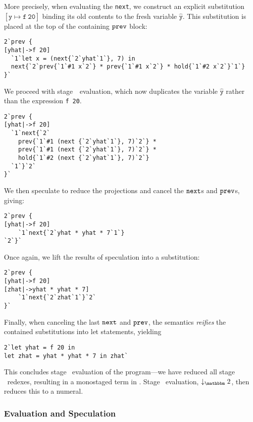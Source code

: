 More precisely, when evaluating the \verb|next|, we construct an explicit
substitution $\mathtt{[\hat y\mapsto f~20]}$ binding its old contents to the
fresh variable $\mathtt{\hat y}$. This substitution is placed at the top of the
containing ${\tt prev}$ block:
\begin{lstlisting} 
2`prev {
[yhat|->f 20]
  `1`let x = (next{`2`yhat`1`}, 7) in
  next{`2`prev{`1`#1 x`2`} * prev{`1`#1 x`2`} * hold{`1`#2 x`2`}`1`}
}`
\end{lstlisting}
We proceed with stage~\bbone\ evaluation, which now duplicates the variable
$\mathtt{\hat y}$ rather than the expression \verb|f 20|.
\begin{lstlisting} 
2`prev {
[yhat|->f 20]
  `1`next{`2`
    prev{`1`#1 (next {`2`yhat`1`}, 7)`2`} * 
    prev{`1`#1 (next {`2`yhat`1`}, 7)`2`} *
    hold{`1`#2 (next {`2`yhat`1`}, 7)`2`}
  `1`}`2`
}`
\end{lstlisting}
We then speculate to reduce the projections and cancel the ${\tt next}$s and ${\tt prev}$s, giving:
\begin{lstlisting} 
2`prev {
[yhat|->f 20]
    `1`next{`2`yhat * yhat * 7`1`}
`2`}`
\end{lstlisting}
Once again, we lift the results of speculation into a substitution:
\begin{lstlisting} 
2`prev {
[yhat|->f 20]
[zhat|->yhat * yhat * 7]
    `1`next{`2`zhat`1`}`2`
}`
\end{lstlisting}
Finally, when canceling the last ${\tt next}$ and ${\tt prev}$, the semantics {\em reifies} the contained substitutions into let statements, yielding
\begin{lstlisting} 
2`let yhat = f 20 in
let zhat = yhat * yhat * 7 in zhat`
\end{lstlisting}

This concludes stage \bbone\ evaluation of the program---we have reduced all
stage \bbone\ redexes, resulting in a monostaged term in \langTwo. Stage \bbtwo\
evaluation, $\tworedsym$, then reduces this to a numeral.

\subsubsection{Evaluation and Speculation}
\label{ssec:dynamics}



